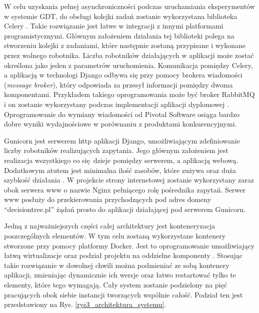 W celu uzyskania pełnej asynchroniczności podczas uruchamiania eksperymentów w systemie GDT, do obsługi kolejki zadań zostanie wykorzystana biblioteka Celery \cite{misc_celery}. Takie rozwiązanie jest łatwe w integracji z innymi platformami programistycznymi. Głównym założeniem działania tej biblioteki polega na stworzeniu kolejki z zadaniami, które następnie zostaną przypisane i wykonane przez wolnego robotnika. Liczba robotników działających w aplikacji może zostać określona jako jeden z parametrów uruchomienia. Komunikacja pomiędzy Celery, a aplikacją w technologi Django odbywa się przy pomocy brokera wiadomości (\textit{message broker}), który odpowiada za przesył informacji pomiędzy dwoma komponentami. Przykładem takiego oprogramowania może być broker RabbitMQ i on zostanie wykorzystany podczas implementacji aplikacji dyplomowej \cite{misc_rabbit}. Oprogramowanie do wymiany wiadomości od Pivotal Software osiąga bardzo dobre wyniki wydajnościowe w porównaniu z produktami konkurencyjnymi.

Gunicorn jest serwerem http aplikacji Django, umożliwiającym zdefiniowanie liczby robotników realizujących zapytania. Jego głównym założeniem jest realizacja wszystkiego co się dzieje pomiędzy serwerem, a aplikacją webową. Dodatkowym atutem jest minimalna ilość zasobów, które zużywa oraz duża szybkość działania \cite{misc_gunicorn}. W projekcie strony internetowej zostanie wykorzystany zaraz obok serwera www o nazwie Nginx pełniącego rolę pośrednika zapytań. Serwer www posłuży do przekierowania przychodzących pod adres domeny \enquote{decisiontree.pl} żądań prosto do aplikacji działającej pod serwerem Gunicorn.

Jedną z najważniejszych części całej architektury jest konteneryzacja poszczególnych elementów. W tym celu zostaną wykorzystane kontenery stworzone przy pomocy platformy Docker. Jest to oprogramowanie umożliwiający łatwą wirtualizacje oraz podział projektu na oddzielne komponenty \cite{misc_docker}. Stosując takie rozwiązanie w dowolnej chwili można podmieniać ze sobą kontenery aplikacji, zmieniając dynamicznie ich wersje oraz łatwo restartować tylko te elementy, które tego wymagają. Cały system zostanie podzielony na pięć pracujących obok siebie instancji tworzących wspólnie całość. Podział ten jest przedstawiony na Rys. \ref{rys3_architektura_systemu}.


 
 





